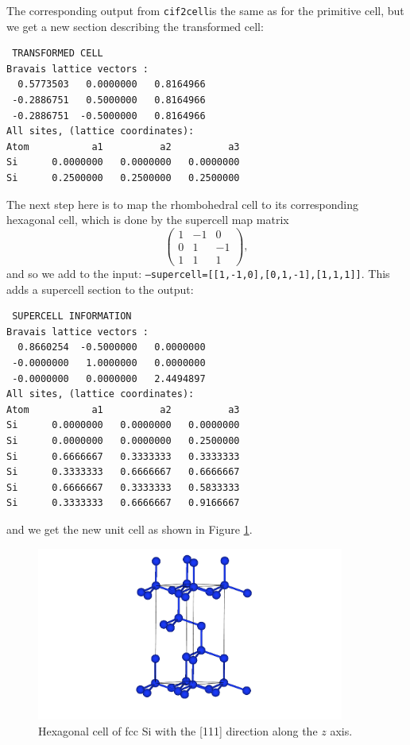 \documentclass[11pt]{article}
\newcommand{\ciftocell}{\texttt{cif2cell}}
\begin{document}
The corresponding output from \ciftocell is the same as for the primitive cell, but we get a new section describing the transformed cell:
\begin{Verbatim}
 TRANSFORMED CELL
Bravais lattice vectors :
  0.5773503   0.0000000   0.8164966 
 -0.2886751   0.5000000   0.8164966 
 -0.2886751  -0.5000000   0.8164966 
All sites, (lattice coordinates):
Atom           a1          a2          a3 
Si      0.0000000   0.0000000   0.0000000
Si      0.2500000   0.2500000   0.2500000
\end{Verbatim}

The next step here is to map the rhombohedral cell to its corresponding hexagonal cell, which is done by the supercell map matrix
\begin{equation}
\begin{pmatrix}
1 & -1 & 0\\
0 & 1 & -1\\
1 & 1 & 1
\end{pmatrix},
\end{equation}
and so we add to the input: \texttt{--supercell=[[1,-1,0],[0,1,-1],[1,1,1]]}. This adds a supercell section to the output:
\begin{Verbatim}
 SUPERCELL INFORMATION
Bravais lattice vectors :
  0.8660254  -0.5000000   0.0000000 
 -0.0000000   1.0000000   0.0000000 
 -0.0000000   0.0000000   2.4494897 
All sites, (lattice coordinates):
Atom           a1          a2          a3 
Si      0.0000000   0.0000000   0.0000000
Si      0.0000000   0.0000000   0.2500000
Si      0.6666667   0.3333333   0.3333333
Si      0.3333333   0.6666667   0.6666667
Si      0.6666667   0.3333333   0.5833333
Si      0.3333333   0.6666667   0.9166667
\end{Verbatim}
and we get the new unit cell as shown in Figure \ref{hexSi}.

\begin{figure}[htbp] %
   \centering
   \includegraphics[width=0.9\textwidth]{Si_hex.pdf} 
   \caption{Hexagonal cell of fcc Si with the [111] direction along the $z$ axis.}
   \label{hexSi}
\end{figure}
\end{document}

